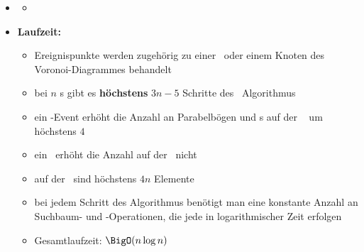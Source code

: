 \begin{itemize}
	\item[]\begin{itemize}
			\item {}
		\end{itemize}
	\item \textbf{Laufzeit:}
		\begin{itemize}
			\item Ereignispunkte werden zugehörig zu einer \site~oder einem Knoten des Voronoi-Diagrammes behandelt
			\item bei $n$ \site s gibt es \textbf{höchstens} $3n-5$ Schritte des \sweep~Algorithmus
			\item ein \site-Event erhöht die Anzahl an Parabelbögen und \bpoint s auf der \beach~ um höchstens $4$
			\item ein \kreis~erhöht die Anzahl auf der \beach~nicht
			\item auf der \beach~sind höchstens $4n$ Elemente
			\item bei jedem Schritt des Algorithmus benötigt man eine konstante Anzahl an Suchbaum- und \PQ-Operationen, die jede in logarithmischer Zeit erfolgen
			\item Gesamtlaufzeit: $\BigO(n\log n)$
		\end{itemize}
\end{itemize}